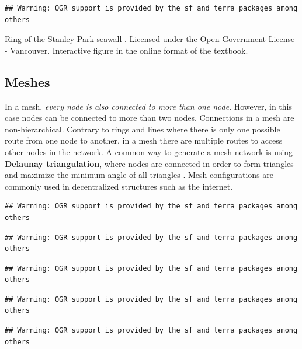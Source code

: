 \documentclass[
]{book}
\begin{document}
\begin{verbatim}
## Warning: OGR support is provided by the sf and terra packages among others
\end{verbatim}

\label{fig:8-stanley-park-seawall}Ring of the Stanley Park seawall \citep{city_of_vancouver_open_nodate}. Licensed under the Open Government License - Vancouver. Interactive figure in the online format of the textbook.

\hypertarget{meshes}{%
\subsection{Meshes}\label{meshes}}

In a mesh, \emph{every node is also connected to more than one node}. However, in this case nodes can be connected to more than two nodes. Connections in a mesh are non-hierarchical. Contrary to rings and lines where there is only one possible route from one node to another, in a mesh there are multiple routes to access other nodes in the network. A common way to generate a mesh network is using \textbf{Delaunay triangulation}, where nodes are connected in order to form triangles and maximize the minimum angle of all triangles \citep{wikimedia_delaunay_2021}. Mesh configurations are commonly used in decentralized structures such as the internet.

\begin{verbatim}
## Warning: OGR support is provided by the sf and terra packages among others
\end{verbatim}

\begin{verbatim}
## Warning: OGR support is provided by the sf and terra packages among others
\end{verbatim}

\begin{verbatim}
## Warning: OGR support is provided by the sf and terra packages among others
\end{verbatim}

\begin{verbatim}
## Warning: OGR support is provided by the sf and terra packages among others
\end{verbatim}

\begin{verbatim}
## Warning: OGR support is provided by the sf and terra packages among others
\end{verbatim}
\end{document}
